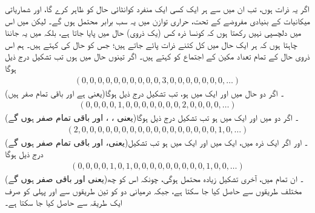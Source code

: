اگر یہ ذرات   ہوں،  تب ان میں سے ہر ایک کسی ایک منفرد کوانٹائی  حال کو ظاہر کرے گا،  اور شماریاتی میکانیات کے بنیادی مفروضے  کے تحت، حراری توازن  میں یہ سب برابر محتمل ہوں گے۔ لیکن میں اس میں دلچسپی نہیں رکھتا ہوں کہ کونسا ذرہ کس  (یک ذروی)  حال میں پایا جاتا ہے، بلکہ میں یہ جاننا چاہتا ہوں کہ ہر ایک حال میں کل کتنے ذرات پائے جاتے ہیں؛ جس کو    حال کی     کہتے ہیں۔ ہم اس  ذروی  حال کے تمام تعداد مکین کے اجتماع  کو    کہتے ہیں۔ اگر تینوں حال   میں ہوں تب تشکیل  درج ذیل ہوگا
\begin{align}\label{مساوات_متماثل_تشکیل_الف}
	(0, 0, 0, 0, 0, 0, 0, 0, 0, 0, 3, 0, 0, 0, 0, 0, 0, 0, \dots)
\end{align} 
(یعنی   ہے اور باقی تمام صفر ہیں)۔ اگر دو حال  میں اور ایک  میں ہو،  تب تشکیل  درج ذیل ہوگا
\begin{align}\label{مساوات_متماثل_تشکیل_ب}
	(0, 0, 0, 0, 1, 0, 0, 0, 0, 0, 0, 0, 2, 0, 0, 0, 0, \dots)
\end{align}  
(یعنی ،  ،   اور باقی تمام صفر ہوں گے)۔  اگر دو  میں اور  ایک  میں ہو  تب تشکیل  درج ذیل ہوگا
\begin{align}\label{مساوات_متماثل_تشکیل_پ}
	(2, 0, 0, 0, 0, 0, 0, 0, 0, 0, 0, 0, 0, 0, 0, 0, 0, 0, 1, 0, \dots)
\end{align} 
(یعنی،   اور باقی تمام صفر ہوں گے)۔ اور اگر ایک ذرہ   میں،  ایک  میں اور ایک  میں ہو  تب تشکیل  درج ذیل ہوگا 
\begin{align}\label{مساوات_متماثل_تشکیل_ت}
	(0, 0, 0, 0, 1, 0, 1, 0, 0, 0, 0, 0, 0, 0, 0, 0, 1, 0, 0, \dots)
\end{align} 
(یعنی   اور باقی صفر ہوں گے)۔ ان تمام میں،  آخری تشکیل  زیادہ محتمل ہوگی،  چونکہ اس کو چھ مختلف طریقوں سے حاصل کیا جا سکتا ہے،  جبکہ درمیانی دو کو تین طریقوں سے اور پہلی کو صرف ایک طریقہ سے حاصل کیا جا سکتا ہے۔


